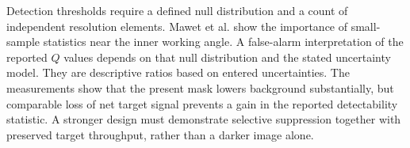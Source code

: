 Detection thresholds require a defined null distribution and a count of independent resolution elements. Mawet et al. show the importance of small-sample statistics near the inner working angle\cite{mawet2014}. A false-alarm interpretation of the reported $Q$ values depends on that null distribution and the stated uncertainty model. They are descriptive ratios based on entered uncertainties. The measurements show that the present mask lowers background substantially, but comparable loss of net target signal prevents a gain in the reported detectability statistic. A stronger design must demonstrate selective suppression together with preserved target throughput, rather than a darker image alone.
